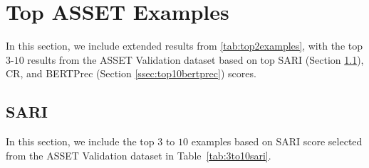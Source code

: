 \documentclass[11pt]{article}
\begin{document}
\section{Top ASSET Examples}
\label{sec:topasset}

In this section, we include extended results from \ref{tab:top2examples}, with the top $3$-$10$ results from the ASSET Validation dataset based on top SARI (Section \ref{ssec:top10sari}), CR, and BERTPrec (Section \ref{ssec:top10bertprec}) scores.

\subsection{SARI}
\label{ssec:top10sari}

In this section, we include the top $3$ to $10$ examples based on SARI score selected from the ASSET Validation dataset in Table~\ref{tab:3to10sari}.
\end{document}
